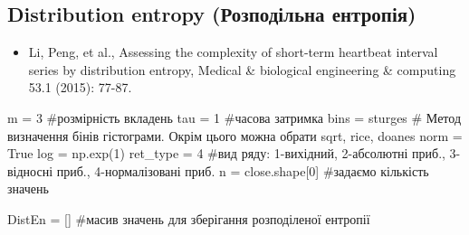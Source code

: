 \documentclass[
  letterpaper,
]{report}
\newenvironment{Shaded}{\begin{snugshade}}{\end{snugshade}}
\newcommand{\CommentTok}[1]{\textcolor[rgb]{0.37,0.37,0.37}{#1}}
\newcommand{\DecValTok}[1]{\textcolor[rgb]{0.68,0.00,0.00}{#1}}
\newcommand{\NormalTok}[1]{\textcolor[rgb]{0.00,0.23,0.31}{#1}}
\newcommand{\OperatorTok}[1]{\textcolor[rgb]{0.37,0.37,0.37}{#1}}
\newcommand{\StringTok}[1]{\textcolor[rgb]{0.13,0.47,0.30}{#1}}
\newcommand{\VariableTok}[1]{\textcolor[rgb]{0.07,0.07,0.07}{#1}}
\providecommand{\tightlist}{%
  \setlength{\itemsep}{0pt}\setlength{\parskip}{0pt}}\usepackage{longtable,booktabs,array}
\begin{document}
\hypertarget{distribution-entropy-ux440ux43eux437ux43fux43eux434ux456ux43bux44cux43dux430-ux435ux43dux442ux440ux43eux43fux456ux44f}{%
\subsection{Distribution entropy (Розподільна
ентропія)}\label{distribution-entropy-ux440ux43eux437ux43fux43eux434ux456ux43bux44cux43dux430-ux435ux43dux442ux440ux43eux43fux456ux44f}}

\begin{itemize}
\tightlist
\item
  Li, Peng, et al., Assessing the complexity of short-term heartbeat
  interval series by distribution entropy, Medical \& biological
  engineering \& computing 53.1 (2015): 77-87.
\end{itemize}

\begin{Shaded}
\begin{Highlighting}[]
\NormalTok{m }\OperatorTok{=} \DecValTok{3} \CommentTok{\#розмірність вкладень}
\NormalTok{tau }\OperatorTok{=} \DecValTok{1} \CommentTok{\#часова затримка}
\NormalTok{bins }\OperatorTok{=} \StringTok{\textquotesingle{}sturges\textquotesingle{}} \CommentTok{\# Метод визначення бінів гістограми. Окрім цього можна обрати sqrt, rice, doanes}
\NormalTok{norm }\OperatorTok{=} \VariableTok{True}
\NormalTok{log }\OperatorTok{=}\NormalTok{ np.exp(}\DecValTok{1}\NormalTok{)}
\NormalTok{ret\_type }\OperatorTok{=} \DecValTok{4} \CommentTok{\#вид ряду: 1{-}вихідний, 2{-}абсолютні приб., 3{-}відносні приб., 4{-}нормалізовані приб. }
\NormalTok{n }\OperatorTok{=}\NormalTok{ close.shape[}\DecValTok{0}\NormalTok{] }\CommentTok{\#задаємо кількість значень}

\NormalTok{DistEn }\OperatorTok{=}\NormalTok{ [] }\CommentTok{\#масив значень для зберігання розподіленої ентропії }
\end{Highlighting}
\end{Shaded}
\end{document}
